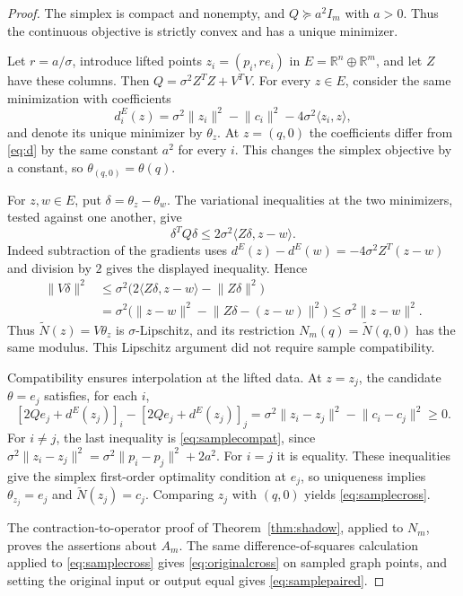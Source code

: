 \documentclass[11pt]{article}
\numberwithin{equation}{section}
\theoremstyle{definition}
\theoremstyle{remark}
\newcommand{\R}{\mathbb R}
\newcommand{\ip}[2]{\langle #1,#2\rangle}
\newcommand{\norm}[1]{\lVert #1\rVert}
\begin{document}
\begin{proof}
The simplex is compact and nonempty, and $Q\succeq a^2I_m$ with
$a>0$. Thus the continuous objective is strictly convex and has a
unique minimizer.

Let $r=a/\sigma$, introduce lifted points $z_i=(p_i,re_i)$ in
$E=\R^n\oplus\R^m$, and let $Z$ have these columns. Then
$Q=\sigma^2 Z^TZ+V^TV$. For every $z\in E$, consider the same
minimization with coefficients
\[
 d_i^E(z)=\sigma^2\norm{z_i}^2-\norm{c_i}^2
                        -4\sigma^2\ip{z_i}{z},
\]
and denote its unique minimizer by $\theta_z$. At $z=(q,0)$ the
coefficients differ from \eqref{eq:d} by the same constant $a^2$
for every $i$. This changes the simplex objective by a constant,
so $\theta_{(q,0)}=\theta(q)$.

For $z,w\in E$, put $\delta=\theta_z-\theta_w$. The variational
inequalities at the two minimizers, tested against one another, give
\[
 \delta^TQ\delta\le2\sigma^2\ip{Z\delta}{z-w}.
\]
Indeed subtraction of the gradients uses
$d^E(z)-d^E(w)=-4\sigma^2Z^T(z-w)$ and division by $2$ gives the
displayed inequality. Hence
\begin{align*}
 \norm{V\delta}^2
 &\le\sigma^2\bigl(2\ip{Z\delta}{z-w}-\norm{Z\delta}^2\bigr)\\
 &=\sigma^2\bigl(\norm{z-w}^2-\norm{Z\delta-(z-w)}^2\bigr)
 \le\sigma^2\norm{z-w}^2.
\end{align*}
Thus $\widetilde N(z)=V\theta_z$ is $\sigma$-Lipschitz, and its
restriction $N_m(q)=\widetilde N(q,0)$ has the same modulus. This
Lipschitz argument did not require sample compatibility.

Compatibility ensures interpolation at the lifted data. At $z=z_j$,
the candidate $\theta=e_j$ satisfies, for each $i$,
\[
 [2Qe_j+d^E(z_j)]_i-[2Qe_j+d^E(z_j)]_j
 =\sigma^2\norm{z_i-z_j}^2-\norm{c_i-c_j}^2\ge0.
\]
For $i\ne j$, the last inequality is \eqref{eq:samplecompat}, since
$\sigma^2\norm{z_i-z_j}^2=\sigma^2\norm{p_i-p_j}^2+2a^2$.
For $i=j$ it is equality. These inequalities give the simplex
first-order optimality condition at $e_j$, so uniqueness implies
$\theta_{z_j}=e_j$ and $\widetilde N(z_j)=c_j$. Comparing $z_j$
with $(q,0)$ yields \eqref{eq:samplecross}.

The contraction-to-operator proof of Theorem~\ref{thm:shadow}, applied
to $N_m$, proves the assertions about $A_m$. The same
difference-of-squares calculation applied to \eqref{eq:samplecross}
gives \eqref{eq:originalcross} on sampled graph points, and setting
the original input or output equal gives \eqref{eq:samplepaired}.
\end{proof}
\end{document}
